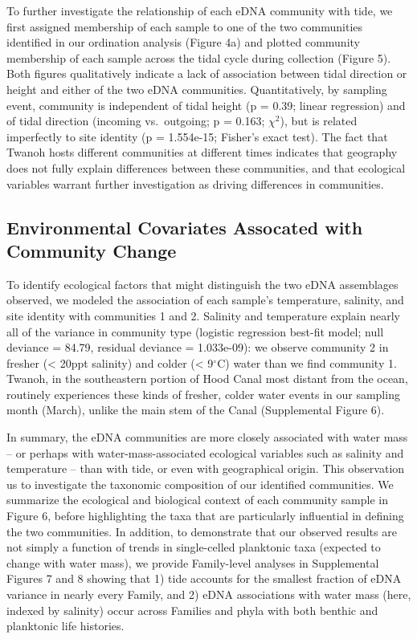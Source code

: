 \documentclass[fleqn,10pt,lineno]{wlpeerj} %
\begin{document}
To further investigate the relationship of each eDNA community with
tide, we first assigned membership of each sample to one of the two
communities identified in our ordination analysis
(Figure 4a) and plotted community membership of each
sample across the tidal cycle during collection (Figure 5). Both figures
qualitatively indicate a lack of association between tidal direction or
height and either of the two eDNA communities. Quantitatively, by
sampling event, community is independent of tidal height (p = 0.39;
linear regression) and of tidal direction (incoming vs.~outgoing; p =
0.163; \(\chi^2\)), but is related imperfectly to site identity (p =
1.554e-15; Fisher's exact test). The fact that Twanoh hosts different
communities at different times indicates that geography does not fully
explain differences between these communities, and that ecological
variables warrant further investigation as driving differences in
communities.

\subsection{Environmental Covariates Assocated with Community
Change}\label{environmental-covariates-assocated-with-community-change}

To identify ecological factors that might distinguish the two eDNA
assemblages observed, we modeled the association of each sample's
temperature, salinity, and site identity with communities 1 and 2.
Salinity and temperature explain nearly all of the variance in community
type (logistic regression best-fit model; null deviance = 84.79,
residual deviance = 1.033e-09): we observe community 2 in fresher
(\textless{} 20ppt salinity) and colder (\textless{} 9\(^\circ\)C) water
than we find community 1. Twanoh, in the southeastern portion of Hood
Canal most distant from the ocean, routinely experiences these kinds of
fresher, colder water events in our sampling month (March), unlike the
main stem of the Canal (Supplemental Figure 6).

In summary, the eDNA communities are more closely associated with water
mass -- or perhaps with water-mass-associated ecological variables such
as salinity and temperature -- than with tide, or even with geographical
origin. This observation us to investigate the taxonomic composition of
our identified communities. We summarize the ecological and biological
context of each community sample in Figure 6, before highlighting the
taxa that are particularly influential in defining the two communities.
In addition, to demonstrate that our observed results are not simply a
function of trends in single-celled planktonic taxa (expected to change
with water mass), we provide Family-level analyses in Supplemental
Figures 7 and 8 showing that 1) tide accounts for the smallest fraction
of eDNA variance in nearly every Family, and 2) eDNA associations with
water mass (here, indexed by salinity) occur across Families and phyla with both benthic and planktonic life histories.
\end{document}
